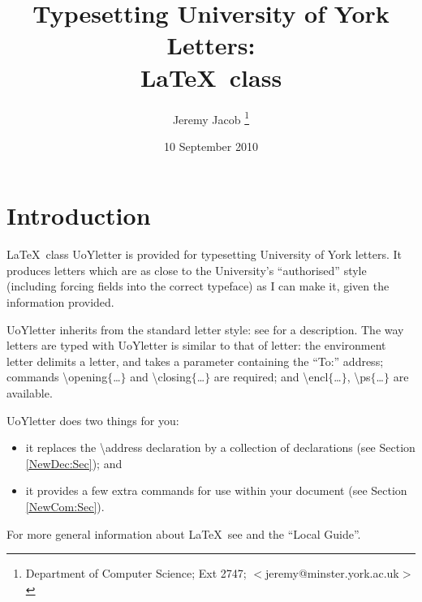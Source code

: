 \documentclass[12pt,a4paper]{article}
\title{Typesetting University of York Letters:\\
                \LaTeX\ class \cmdsty{UoYletter}}
\author{Jeremy Jacob
        \thanks{Department of Computer Science;
                Ext 2747; $<$jeremy@minster.york.ac.uk$>$}}
\date{10 September 2010}
\newcommand{\cmdsty}[1]{\textsf{#1}}
\newcommand{\cmd}[1]{\cmdsty{\textbackslash#1}}
\newcommand{\pcmd}[2]{\cmdsty{\cmd{#1}$\{$#2$\}$}}
\begin{document}
\maketitle
\section{Introduction}
\LaTeX\ class \cmdsty{UoYletter} is provided for typesetting
University of York letters.  It produces letters which are as close to
the University's ``authorised'' style (including forcing fields into
the correct typeface) as I can make it, given the information
provided.

\cmdsty{UoYletter} inherits from the standard \cmdsty{letter} style:
see  for a description.  The way letters are
typed with \cmdsty{UoYletter} is similar to that of \cmdsty{letter}:
the environment \cmdsty{letter} delimits a letter, and takes a
parameter containing the ``To:'' address; commands
\pcmd{opening}{\ldots} and \pcmd{closing}{\ldots} are required; and
\pcmd{encl}{\ldots}, \pcmd{ps}{\ldots} are available.
 
\cmdsty{UoYletter} does two things for you:
\begin{itemize}
\item it replaces the \cmd{address} declaration by a collection of
declarations (see Section \ref{NewDec:Sec}); and
\item it provides a few extra commands for use within your document
(see Section \ref{NewCom:Sec}).
\end{itemize}

For more general information about \LaTeX\ see
 and the ``Local Guide''.
\end{document}
